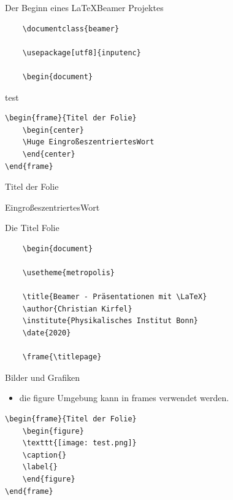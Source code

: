 \documentclass{beamer}
\begin{document}
\begin{frame}[containsverbatim]{Der Beginn eines \LaTeX Beamer Projektes}
\begin{lstlisting}
    \documentclass{beamer}

    \usepackage[utf8]{inputenc}

    \begin{document}
\end{lstlisting}
\end{frame}


\begin{frame}[containsverbatim]{test}
\begin{lstlisting}
\begin{frame}{Titel der Folie}
    \begin{center}
    \Huge EingroßeszentriertesWort
    \end{center}
\end{frame}
\end{lstlisting}
\end{frame}

\begin{frame}{Titel der Folie}
    \begin{center}
    \Huge EingroßeszentriertesWort
    \end{center}
\end{frame}


\begin{frame}{Die Titel Folie}
\begin{lstlisting}
    \begin{document}

    \usetheme{metropolis}

    \title{Beamer - Präsentationen mit \LaTeX}
    \author{Christian Kirfel}
    \institute{Physikalisches Institut Bonn}
    \date{2020}

    \frame{\titlepage}
\end{lstlisting}
\end{frame}

\frame{\titlepage}


\begin{frame}[containsverbatim]{Bilder und Grafiken}
\begin{itemize}
    \item die figure Umgebung kann in frames verwendet werden.
\end{itemize}
\begin{lstlisting}
\begin{frame}{Titel der Folie}
    \begin{figure}
    \texttt{[image: test.png]}
    \caption{}
    \label{}
    \end{figure}
\end{frame}
\end{lstlisting}
\end{frame}
\end{document}
